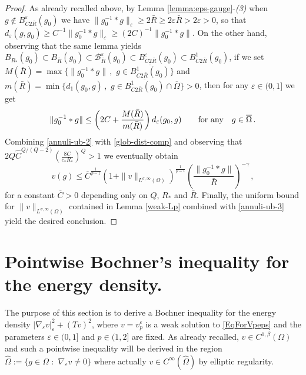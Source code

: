 \documentclass[10pt]{amsart}
\numberwithin{equation}{section}
\theoremstyle{definition}
\newcommand{\eps}{\varepsilon}
\newcommand{\egrad}{\nabla_{\eps}}
\begin{document}
\begin{proof}
 As already recalled above, by Lemma \ref{lemma:eps-gauge}-{\it (3)} when $g \not \in B^\varepsilon_{C2\bar{R}}(g_0)$ we have $\| g_0^{-1}*g\|_\varepsilon \geq 2 \bar{R} \geq 2 \varepsilon \bar{R}>2\varepsilon>0$, so that $d_\varepsilon(g,g_0)\geq C^{-1} \| g_0^{-1}*g\|_\varepsilon \geq (2C)^{-1} \| g_0^{-1}*g\|$.  On the other hand, observing that the same lemma yields $B_{R_\ast}(g_0) \subset B_{\bar{R}}(g_0)\subset \mathcal{B}^\varepsilon_{\bar{R}}(g_0) \subset B_{C2\bar{R}}^\varepsilon(g_0) \subset  B^1_{C2\bar{R}}(g_0) $, if we set $M(\bar{R})=\max \{ \|g_0^{-1}*g \| \, , \,\, g \in \overline{B^1_{C2\bar{R}}(g_0)}\}$ and $m(\bar{R})= \min \{ d_1(g_0,g) \, , \, \, g \in \overline{B^1_{C2\bar{R}}(g_0)} \cap \overline{\Omega}\}>0$, then for any $\varepsilon \in (0,1]$ we get
 \begin{equation} 
\label{glob-dist-comp} 
 \|g_0^{-1}*g\|\leq \left( 2C+ \frac{M(\bar{R})}{m(\bar{R})} \right) d_\varepsilon(g_0,g) \qquad \hbox{for any} \quad g \in \overline{\Omega} \, . 
 \end{equation}
 Combining \eqref{annuli-ub-2} with \eqref{glob-dist-comp} and observing that $ 2Q \widehat{C}^{Q/(Q-2)} \left(\frac{8C}{c_*R_\ast}\right)^Q >1$
  we eventually obtain 
\begin{equation}
\label{annuli-ub-3}
v (g)\leq \overline{C}^{\frac{1}{p-1}} \left(1 + \| v\|_{L^{\sigma,\infty}(\Omega)}  \right)^{\frac{1}{p-1}}  \left( \frac{\| g_0^{-1}*g\|}{\bar{R}}\right)^{-\gamma} \, ,
\end{equation}
for a constant $\overline{C}>0$ depending only on $Q$, $R_\ast$ and $\bar{R}$. 
Finally, the uniform bound for  $\| v\|_{L^{\sigma,\infty}(\Omega)}$ contained in Lemma \ref{weak-Lp} combined with \eqref{annuli-ub-3} yield the desired conclusion. 

\end{proof}


\section{Pointwise Bochner's inequality for the energy density.}

The purpose of this section is to derive a Bochner inequality for the energy density $|\egrad v |_\varepsilon^2+(Tv)^2$, where $v=v^\varepsilon_p$ is a weak solution to \eqref{EqForVpeps} and the parameters $\varepsilon \in (0,1]$ and $p \in (1,2]$ are fixed. As already recalled, $v\in C^{1,\beta}(\Omega)$ and such a pointwise inequality will be derived in the region $\widehat{\Omega}:=\{ g \in \Omega \, \, : \, \, \egrad v \neq 0\}$ where actually $v \in C^\infty(\widehat{\Omega})$ by elliptic regularity.
\end{document}
